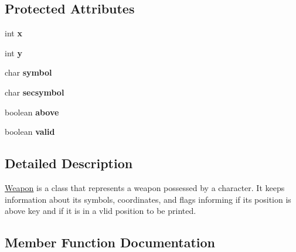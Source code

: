 \subsection*{Protected Attributes}
\begin{DoxyCompactItemize}
\item 
\mbox{\label{classdkeep_1_1logic_1_1_weapon_af6f8a376f3f843d84890f823b696449d}} 
int {\bfseries x}
\item 
\mbox{\label{classdkeep_1_1logic_1_1_weapon_adab0e9dd2253065c9bf26eb90df44937}} 
int {\bfseries y}
\item 
\mbox{\label{classdkeep_1_1logic_1_1_weapon_ac25e811e29333780f6f1ddf88b22c202}} 
char {\bfseries symbol}
\item 
\mbox{\label{classdkeep_1_1logic_1_1_weapon_a676b1b620341ad36649cd8408475c56b}} 
char {\bfseries secsymbol}
\item 
\mbox{\label{classdkeep_1_1logic_1_1_weapon_a89d4f4b0d4c737af7ef786e88f254085}} 
boolean {\bfseries above}
\item 
\mbox{\label{classdkeep_1_1logic_1_1_weapon_a453cf282b3402e717715f3f3c6154a67}} 
boolean {\bfseries valid}
\end{DoxyCompactItemize}


\subsection{Detailed Description}
\hyperlink{classdkeep_1_1logic_1_1_weapon}{Weapon} is a class that represents a weapon possessed by a character. It keeps information about it\textquotesingle{}s symbols, coordinates, and flags informing if it\textquotesingle{}s position is above key and if it is in a vlid position to be printed. 

\subsection{Member Function Documentation}
\mbox{\label{classdkeep_1_1logic_1_1_weapon_ad60afd31631a1552c749b5ddd0a5b949}} 
